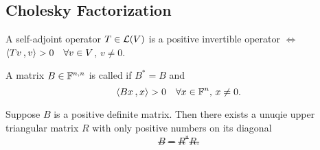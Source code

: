 \subsection{Cholesky Factorization}

\begin{thm}
  \label{thm: positive invertible operator}
  A self-adjoint operator $T\in \mathcal{L}(V)$ is a positive invertible operator $\iff$ $\ip{Tv}{v} >0 \quad \forall v \in V$, $v \neq 0$.
\end{thm}

\begin{mydef}
  A matrix $B \in \mathbb{F}^{n,n}$ is called  if $B^* = B$ and
  \[
    \ip{Bx}{x} > 0 \quad \forall x \in \myF^n, \, x \neq 0.
  \]
\end{mydef}

\begin{thm}
  Suppose $B$ is a positive definite matrix. Then there exists a unuqie upper triangular matrix $R$ with only positive numbers on its diagonal \st
  \[
    B = R^*R.
  \]
\end{thm}

